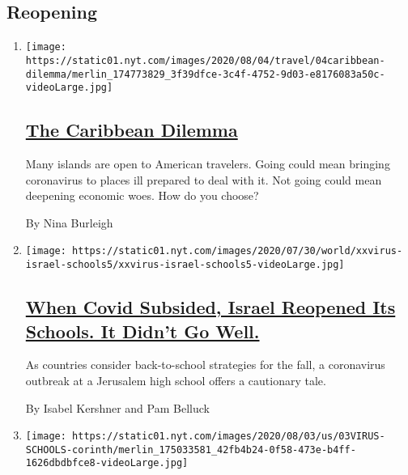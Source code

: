 \hypertarget{reopening}{%
\subsection{Reopening}\label{reopening}}

\begin{enumerate}
\def\labelenumi{\arabic{enumi}.}
\item
  \texttt{[image: https://static01.nyt.com/images/2020/08/04/travel/04caribbean-dilemma/merlin\_174773829\_3f39dfce-3c4f-4752-9d03-e8176083a50c-videoLarge.jpg]}

  \hypertarget{the-caribbean-dilemma}{%
  \subsection{\texorpdfstring{\href{/2020/08/04/travel/coronavirus-caribbean-vacations.html}{The
  Caribbean
  Dilemma}}{The Caribbean Dilemma}}\label{the-caribbean-dilemma}}

  Many islands are open to American travelers. Going could mean bringing
  coronavirus to places ill prepared to deal with it. Not going could
  mean deepening economic woes. How do you choose?

  By Nina Burleigh
\item
  \texttt{[image: https://static01.nyt.com/images/2020/07/30/world/xxvirus-israel-schools5/xxvirus-israel-schools5-videoLarge.jpg]}

  \hypertarget{when-covid-subsided-israel-reopened-its-schools-it-didnt-go-well}{%
  \subsection{\texorpdfstring{\href{/2020/08/04/world/middleeast/coronavirus-israel-schools-reopen.html}{When
  Covid Subsided, Israel Reopened Its Schools. It Didn't Go
  Well.}}{When Covid Subsided, Israel Reopened Its Schools. It Didn't Go Well.}}\label{when-covid-subsided-israel-reopened-its-schools-it-didnt-go-well}}

  As countries consider back-to-school strategies for the fall, a
  coronavirus outbreak at a Jerusalem high school offers a cautionary
  tale.

  By Isabel Kershner and Pam Belluck
\item
  \texttt{[image: https://static01.nyt.com/images/2020/08/03/us/03VIRUS-SCHOOLS-corinth/merlin\_175033581\_42fb4b24-0f58-473e-b4ff-1626dbdbfce8-videoLarge.jpg]}

  \hypertarget{as-the-coronavirus-comes-to-school-a-tough-choice-when-to-close}{%
}
\end{enumerate}
